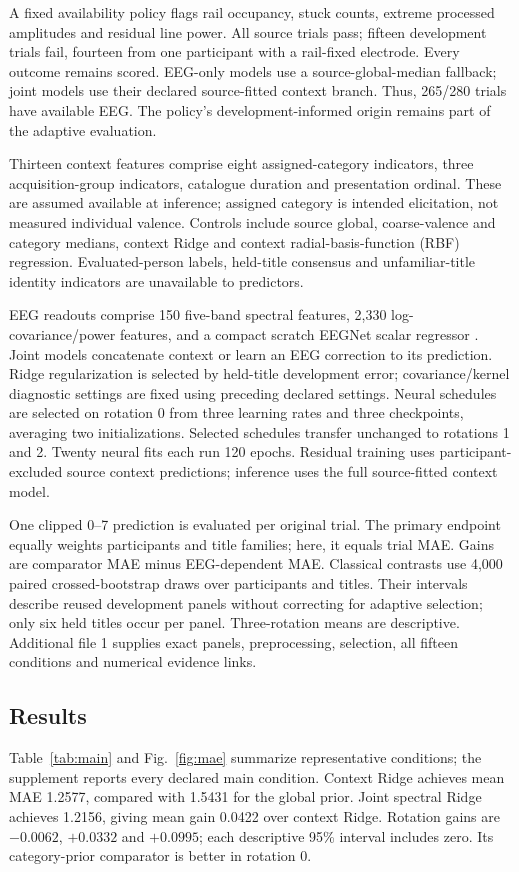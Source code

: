 \documentclass[11pt,a4paper]{article}
\begin{document}
A fixed availability policy flags rail occupancy, stuck counts, extreme processed amplitudes and residual line power. All source trials pass; fifteen development trials fail, fourteen from one participant with a rail-fixed electrode. Every outcome remains scored. EEG-only models use a source-global-median fallback; joint models use their declared source-fitted context branch. Thus, 265/280 trials have available EEG. The policy's development-informed origin remains part of the adaptive evaluation.

Thirteen context features comprise eight assigned-category indicators, three acquisition-group indicators, catalogue duration and presentation ordinal. These are assumed available at inference; assigned category is intended elicitation, not measured individual valence. Controls include source global, coarse-valence and category medians, context Ridge and context radial-basis-function (RBF) regression. Evaluated-person labels, held-title consensus and unfamiliar-title identity indicators are unavailable to predictors.

EEG readouts comprise 150 five-band spectral features, 2,330 log-covariance/power features, and a compact scratch EEGNet scalar regressor \cite{lawhern2018eegnet}. Joint models concatenate context or learn an EEG correction to its prediction. Ridge regularization is selected by held-title development error; covariance/kernel diagnostic settings are fixed using preceding declared settings. Neural schedules are selected on rotation 0 from three learning rates and three checkpoints, averaging two initializations. Selected schedules transfer unchanged to rotations 1 and 2. Twenty neural fits each run 120 epochs. Residual training uses participant-excluded source context predictions; inference uses the full source-fitted context model.

One clipped 0--7 prediction is evaluated per original trial. The primary endpoint equally weights participants and title families; here, it equals trial MAE. Gains are comparator MAE minus EEG-dependent MAE. Classical contrasts use 4,000 paired crossed-bootstrap draws over participants and titles. Their intervals describe reused development panels without correcting for adaptive selection; only six held titles occur per panel. Three-rotation means are descriptive. Additional file 1 supplies exact panels, preprocessing, selection, all fifteen conditions and numerical evidence links.

\subsection*{Results}
Table~\ref{tab:main} and Fig.~\ref{fig:mae} summarize representative conditions; the supplement reports every declared main condition. Context Ridge achieves mean MAE 1.2577, compared with 1.5431 for the global prior. Joint spectral Ridge achieves 1.2156, giving mean gain 0.0422 over context Ridge. Rotation gains are \(-0.0062\), \(+0.0332\) and \(+0.0995\); each descriptive 95\% interval includes zero. Its category-prior comparator is better in rotation 0.
\end{document}
